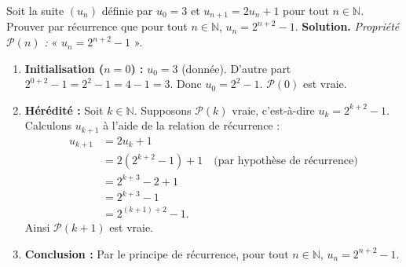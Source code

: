 \documentclass[11pt]{article}
\begin{document}
\begin{exoresolu}
Soit la suite $(u_n)$ définie par $u_0 = 3$ et $u_{n+1} = 2u_n + 1$ pour tout $n \in \mathbb{N}$.
Prouver par récurrence que pour tout $n \in \mathbb{N}$, $u_n = 2^{n+2} - 1$.
\tcblower
\textbf{Solution.}
\emph{Propriété $\mathcal{P}(n)$ :} « $u_n = 2^{n+2} - 1$ ».
\begin{enumerate}
    \item \textbf{Initialisation ($n=0$) :} $u_0 = 3$ (donnée). D'autre part $2^{0+2} - 1 = 2^2 - 1 = 4 - 1 = 3$. Donc $u_0 = 2^{2} - 1$. $\mathcal{P}(0)$ est vraie.
    \item \textbf{Hérédité :} Soit $k \in \mathbb{N}$. Supposons $\mathcal{P}(k)$ vraie, c'est-à-dire $u_k = 2^{k+2} - 1$.
    Calculons $u_{k+1}$ à l'aide de la relation de récurrence :
    \begin{align*}
        u_{k+1} &= 2u_k + 1 \\
                &= 2(2^{k+2} - 1) + 1 \quad \text{(par hypothèse de récurrence)} \\
                &= 2^{k+3} - 2 + 1 \\
                &= 2^{k+3} - 1 \\
                &= 2^{(k+1)+2} - 1.
    \end{align*}
    Ainsi $\mathcal{P}(k+1)$ est vraie.
    \item \textbf{Conclusion :} Par le principe de récurrence, pour tout $n \in \mathbb{N}$, $u_n = 2^{n+2} - 1$.
\end{enumerate}
\end{exoresolu}
\end{document}
